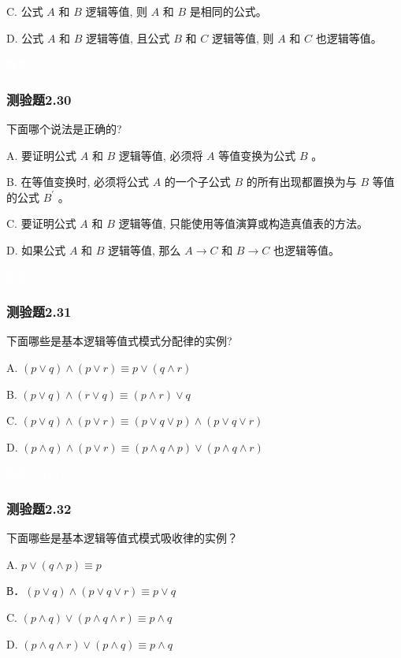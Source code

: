 \documentclass[UTF8, heading=true]{ctexart}
\begin{document}
C. 公式 $A$ 和 $B$ 逻辑等值, 则 $A$ 和 $B$ 是相同的公式。

D. 公式 $A$ 和 $B$ 逻辑等值, 且公式 $B$ 和 $C$ 逻辑等值, 则 $A$ 和 $C$ 也逻辑等值。

\textcolor{white}{答案：C}

\subsubsection{测验题2.30}

下面哪个说法是正确的?

A. 要证明公式 $A$ 和 $B$ 逻辑等值, 必须将 $A$ 等值变换为公式 $B$ 。

B. 在等值变换时, 必须将公式 $A$ 的一个子公式 $B$ 的所有出现都置换为与 $B$ 等值的公式 $B^{\prime}$ 。

C. 要证明公式 $A$ 和 $B$ 逻辑等值, 只能使用等值演算或构造真值表的方法。

D. 如果公式 $A$ 和 $B$ 逻辑等值, 那么 $A \rightarrow C$ 和 $B \rightarrow C$ 也逻辑等值。

\textcolor{white}{答案：D}

\subsubsection{测验题2.31}

下面哪些是基本逻辑等值式模式分配律的实例?

A. $(p \vee q) \wedge(p \vee r) \equiv p \vee(q \wedge r)$

B. $(p \vee q) \wedge(r \vee q) \equiv(p \wedge r) \vee q$

C. $(p \vee q) \wedge(p \vee r) \equiv(p \vee q \vee p) \wedge(p \vee q \vee r)$

D. $(p \wedge q) \wedge(p \vee r) \equiv(p \wedge q \wedge p) \vee(p \wedge q \wedge r)$

\textcolor{white}{答案：ABD}

\subsubsection{测验题2.32}

下面哪些是基本逻辑等值式模式吸收律的实例？

A. $p \vee(q \wedge p) \equiv p$

В．$(p \vee q) \wedge(p \vee q \vee r) \equiv p \vee q$

C. $(p \wedge q) \vee(p \wedge q \wedge r) \equiv p \wedge q$

D.  $(p \wedge q \wedge r) \vee(p \wedge q) \equiv p \wedge q$
\end{document}
